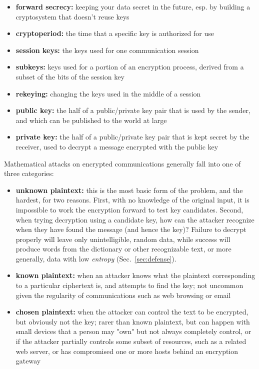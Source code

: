 \begin{itemize}
\item {\bf forward secrecy:} keeping your data secret in the future, esp. by
  building a cryptosystem that doesn't reuse keys
\item {\bf cryptoperiod:} the time that a specific key is authorized for use
\item {\bf session keys:} the keys used for one communication session
\item {\bf subkeys:} keys used for a portion of an encryption process, derived
  from a subset of the bits of the session key
\item {\bf rekeying:} changing the keys used in the middle of a session
\item {\bf public key:} the half of a public/private key pair that is
  used by the sender, and which can be published to the world at
  large
\item {\bf private key:} the half of a public/private key pair that is
  kept secret by the receiver, used to decrypt a message encrypted
  with the public key
\end{itemize}

Mathematical attacks on encrypted communications
generally fall into one of three categories:

\begin{itemize}
\item {\bf unknown plaintext:} this is the most basic form of the
  problem, and the hardest, for two reasons.  First, with no knowledge
  of the original input, it is impossible to work the encryption
  forward to test key candidates.  Second, when trying decryption
  using a candidate key, how can the attacker recognize when they have
  found the message (and hence the key)?   Failure to decrypt properly
  will leave only unintelligible, random data, while success will
  produce words from the dictionary or other recognizable text, or
  more generally, data with low \emph{entropy} (Sec.~\ref{sec:defense}).
\item {\bf known plaintext:} when an attacker knows what the plaintext
  corresponding to a particular ciphertext is, and attempts to find
  the key; not uncommon given the regularity of communications such as
  web browsing or email
\item {\bf chosen plaintext:} when the attacker can control the text to be
  encrypted, but obviously not the key; rarer than known plaintext,
  but can happen with small devices that a person may "own" but not
  always completely control, or if the attacker partially controls
  some subset of resources, such as a related web server, or has
  compromised one or more hosts behind an encryption gateway
\end{itemize}


